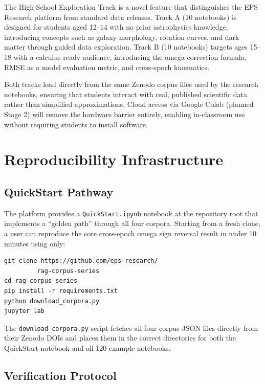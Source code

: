 \documentclass[twocolumn]{aastex631}
\begin{document}
The High-School Exploration Track is a novel feature that distinguishes the
EPS Research platform from standard data releases. Track A (10 notebooks) is
designed for students aged 12--14 with no prior astrophysics knowledge,
introducing concepts such as galaxy morphology, rotation curves, and dark matter
through guided data exploration. Track B (10 notebooks) targets ages 15--18
with a calculus-ready audience, introducing the omega correction formula,
RMSE as a model evaluation metric, and cross-epoch kinematics.

Both tracks load directly from the same Zenodo corpus files used by the
research notebooks, ensuring that students interact with real, published
scientific data rather than simplified approximations. Cloud access via
Google Colab (planned Stage 2) will remove the hardware barrier entirely,
enabling in-classroom use without requiring students to install software.

\section{Reproducibility Infrastructure}
\label{sec:reproducibility}

\subsection{QuickStart Pathway}
\label{sec:quickstart}

The platform provides a \texttt{QuickStart.ipynb} notebook at the repository
root that implements a ``golden path'' through all four corpora. Starting from
a fresh clone, a user can reproduce the core cross-epoch omega sign reversal
result in under 10 minutes using only:

\begin{verbatim}
git clone https://github.com/eps-research/
         rag-corpus-series
cd rag-corpus-series
pip install -r requirements.txt
python download_corpora.py
jupyter lab
\end{verbatim}

The \texttt{download\_corpora.py} script fetches all four corpus JSON files
directly from their Zenodo DOIs and places them in the correct directories
for both the QuickStart notebook and all 120 example notebooks.

\subsection{Verification Protocol}
\label{sec:verification}
\end{document}
